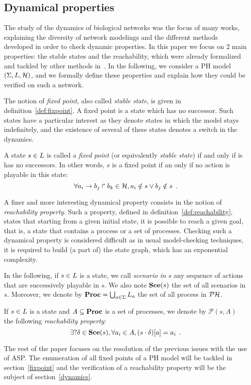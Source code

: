 \subsection*{Dynamical properties}

The study of the dynamics of biological networks was the focus of many works, explaining the diversity of network modelings and the different methods developed in order to check dynamic properties.
In this paper we focus on 2 main properties: the stable states and the reachability,
which were already formalized and tackled by other methods in~\cite{PMR10-TCSB,PMR12-MSCS}.
In the following, we consider a PH model $(\Sigma,L,\mathcal{H})$,
and we formally define these properties
and explain how they could be verified on such a network.

The notion of \emph{fixed point}, also called \emph{stable state},
is given in definition~\ref{def:fixpoint}.
A fixed point is a state which has no successor.
Such states have a particular interest as they denote states in which the model
stays indefinitely,
and the existence of several of these states denotes a switch in the dynamics.

\begin{definition}
\label{def:fixpoint}
  A state $s \in L$ is called a \emph{fixed point}
  (or equivalently \emph{stable state})
  if and only if is has no successors.
  In other words, $s$ is a fixed point if an only if no action is playable in this state:
  \[\forall a_i\rightarrow b_j\Rsh b_k \in \mathcal{H}, a_i \notin s \vee b_j \notin s \enspace.\]
\end{definition}

A finer and more interesting dynamical property consists in
the notion of \emph{reachability property}.
Such a property, defined in definition~\ref{def:reachability},
states that starting from a given initial state, it is possible
to reach a given goal, that is, a state that contains a process
or a set of processes.
Checking such a dynamical property is considered difficult
as in usual model-checking techniques,
it is required to build (a part of) the state graph,
which has an exponential complexity.

In the following, if $s \in L$ is a state,
we call \emph{scenario in $s$}
any sequence of actions that are successively playable in $s$.
We also note $\mathbf{Sce}(s)$ the set of all scenarios in $s$.
Moreover, we denote by $\mathbf{Proc} = \bigcup_{a \in \Sigma} L_a$
the set of all process in $\mathcal{PH}$.

\begin{definition}
\label{def:reachability}
  If $s \in L$ is a state and $A \subseteq \mathbf{Proc}$ is a set of processes,
  we denote by $\mathcal{P}(s, A)$ the following \emph{reachability property}:
  \[\exists? \delta \in \mathbf{Sce}(s), \forall a_i \in A, {(s \cdot \delta)[a]} = a_i
    \enspace.\]
\end{definition}

The rest of the paper focuses on the resolution of the previous issues
with the use of ASP.
The enumeration of all fixed points of a PH model will be tackled in
section~\ref{fixpoint}
and the verification of a reachability property will be the subject of
section~\ref{dynamics}.
